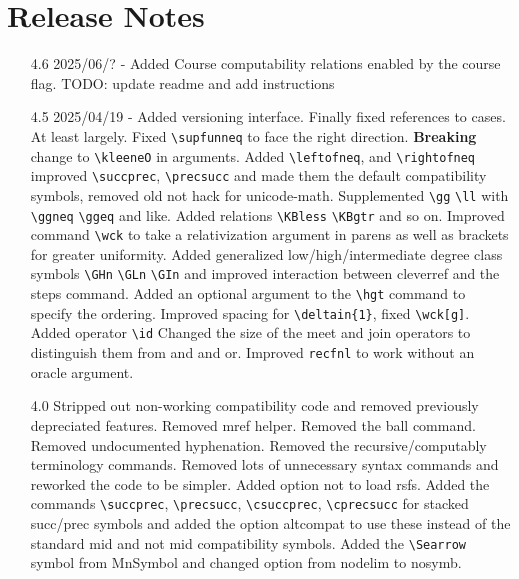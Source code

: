 \documentclass[leqno,11pt]{amsart}
\begin{document}
\section{Release Notes}


\begin{itemize}
	\item[4.6] 2025/06/?  - Added Course computability relations enabled by the course flag.  TODO: update readme and add instructions
	\item[4.5] 2025/04/19 - Added versioning interface.  Finally fixed references to cases.  At least largely.  Fixed \verb=\supfunneq= to face the right direction. \textbf{Breaking} change to \verb=\kleeneO= in arguments.  Added \verb=\leftofneq=, and \verb=\rightofneq= improved \verb=\succprec=, \verb=\precsucc= and made them the default compatibility symbols, removed old not hack for unicode-math.  Supplemented \verb=\gg= \verb=\ll= with \verb=\ggneq= \verb=\ggeq= and like.  Added relations \verb=\KBless= \verb=\KBgtr= and so on.  Improved command \verb=\wck= to take a relativization argument in parens as well as brackets for greater uniformity.  Added generalized low/high/intermediate degree class symbols \verb=\GHn= \verb=\GLn= \verb=\GIn= and improved interaction between cleverref and the steps command.  Added an optional argument to the \verb=\hgt= command to specify the ordering.  Improved spacing for \verb=\deltain{1}=, fixed \verb=\wck[g]=.  Added operator \verb=\id=  Changed the size of the meet and join operators to distinguish them from and and or.  Improved \verb=recfnl= to work without an oracle argument.
	\item[4.0] Stripped out non-working compatibility code and removed previously depreciated features.  Removed mref helper.  Removed the ball command.  Removed undocumented hyphenation.  Removed the recursive/computably terminology commands.   Removed lots of unnecessary syntax commands and reworked the code to be simpler.  Added option not to load rsfs.  Added the commands \verb=\succprec=, \verb=\precsucc=, \verb=\csuccprec=, \verb=\cprecsucc= for stacked succ/prec symbols and added the option altcompat to use these instead of the standard mid and not mid compatibility symbols.  Added the \verb=\Searrow= symbol from MnSymbol and changed option from nodelim to nosymb.

\end{itemize}
\end{document}
